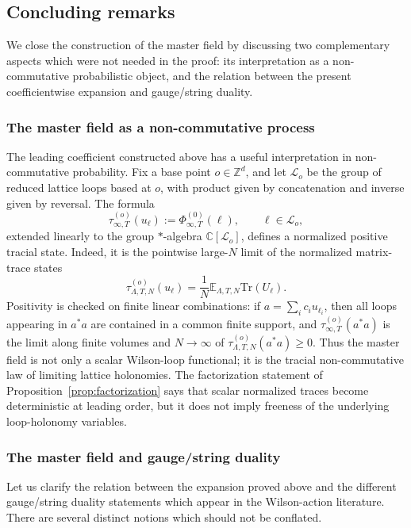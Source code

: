 \documentclass[11pt,a4paper,reqno]{amsart}
\theoremstyle{definition}
\theoremstyle{remark}
\newcommand\Z{{\mathbb{Z}}}
\newcommand\Tr{{\mathrm{Tr}}}
\begin{document}
\subsection{Concluding remarks}\label{subsec:concluding-remarks}

We close the construction of the master field by discussing two complementary aspects which were not needed in the proof: its interpretation as a non-commutative probabilistic object, and the relation between the present coefficientwise expansion and gauge/string duality.

\subsubsection*{The master field as a non-commutative process}

The leading coefficient constructed above has a useful interpretation in non-commutative probability.  Fix a base point $o\in\Z^d$, and let $\mathcal L_o$ be the group of reduced lattice loops based at $o$, with product given by concatenation and inverse given by reversal.  The formula
\[
\tau_{\infty,T}^{(o)}(u_\ell):=\Phi^{(0)}_{\infty,T}(\ell),\qquad \ell\in\mathcal L_o,
\]
extended linearly to the group $*$-algebra $\mathbb C[\mathcal L_o]$, defines a normalized positive tracial state.  Indeed, it is the pointwise large-$N$ limit of the normalized matrix-trace states
\[
\tau_{\Lambda,T,N}^{(o)}(u_\ell)
=
\frac1N\mathbb E_{\Lambda,T,N}\Tr(U_\ell).
\]
Positivity is checked on finite linear combinations: if $a=\sum_i c_i u_{\ell_i}$, then all loops appearing in $a^*a$ are contained in a common finite support, and $\tau_{\infty,T}^{(o)}(a^*a)$ is the limit along finite volumes and $N\to\infty$ of $\tau_{\Lambda,T,N}^{(o)}(a^*a)\ge0$.  Thus the master field is not only a scalar Wilson-loop functional; it is the tracial non-commutative law of limiting lattice holonomies.  The factorization statement of Proposition~\ref{prop:factorization} says that scalar normalized traces become deterministic at leading order, but it does not imply freeness of the underlying loop-holonomy variables.

\subsubsection*{The master field and gauge/string duality}

Let us clarify the relation between the expansion proved above and the different gauge/string
duality statements which appear in the Wilson-action literature.  There are several distinct
notions which should not be conflated.
\end{document}
